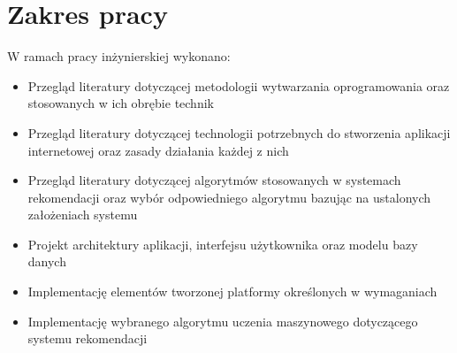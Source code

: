 \newpage

\section{Zakres pracy}
\label{sec:zakresPracy}

W ramach pracy inżynierskiej wykonano:
\begin{itemize}
	\item Przegląd literatury dotyczącej metodologii wytwarzania oprogramowania oraz stosowanych w ich obrębie technik
	\item Przegląd literatury dotyczącej technologii potrzebnych do stworzenia aplikacji internetowej oraz zasady działania każdej z nich
	\item Przegląd literatury dotyczącej algorytmów stosowanych w systemach rekomendacji oraz wybór odpowiedniego algorytmu bazując na ustalonych założeniach systemu	
	\item Projekt architektury aplikacji, interfejsu użytkownika oraz modelu bazy danych
	\item Implementację elementów tworzonej platformy określonych w wymaganiach
	\item Implementację wybranego algorytmu uczenia maszynowego dotyczącego systemu rekomendacji

	
\end{itemize}